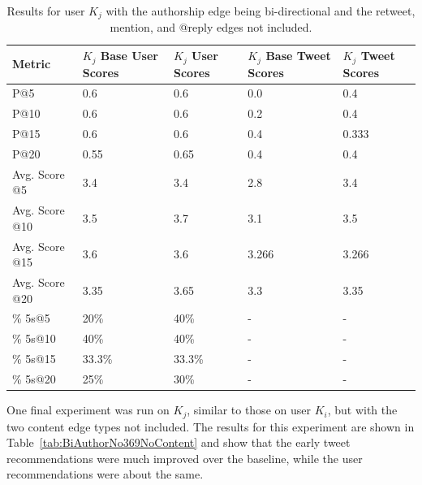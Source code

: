 \begin{table}
\centering
\begin{tabular}{l|p{2.2cm}|p{2.2cm}|p{2.2cm}|p{2.2cm}}
{\bf Metric} & {\bf $K_{j}$ Base User Scores} & {\bf $K_{j}$ User Scores} & {\bf $K_{j}$ Base Tweet Scores} & {\bf $K_{j}$ Tweet Scores} \\ \hline
P@5   & 0.6 & 0.6 & 0.0 & 0.4 \\ \hline
P@10 & 0.6 & 0.6 & 0.2 & 0.4 \\ \hline
P@15 & 0.6 & 0.6 & 0.4 & 0.333 \\ \hline
P@20 & 0.55 & 0.65 & 0.4 & 0.4 \\ \hline

Avg. Score @5   & 3.4 & 3.4 & 2.8 & 3.4 \\ \hline
Avg. Score @10 & 3.5 & 3.7 & 3.1 & 3.5 \\ \hline
Avg. Score @15 & 3.6 & 3.6 & 3.266 & 3.266 \\ \hline
Avg. Score @20 & 3.35 & 3.65 & 3.3 & 3.35 \\ \hline

\% 5s@5    & 20\% & 40\% & - & - \\ \hline
\% 5s@10  & 40\% & 40\% & - & - \\ \hline
\% 5s@15  & 33.3\% & 33.3\% & - & - \\ \hline
\% 5s@20  & 25\% & 30\% & - & - \\

\end{tabular}
\caption[Results for user $K_{j}$ using combined configuration 1]{Results for user $K_{j}$ with the authorship edge being bi-directional and the retweet, mention, and @reply edges not included.}
\label{tab:BiAuthorNo369Kj}
\end{table}

One final experiment was run on $K_{j}$, similar to those on user $K_{i}$, but with the two content edge types not included. The results for this experiment are shown in Table~\ref{tab:BiAuthorNo369NoContent} and show that the early tweet recommendations were much improved over the baseline, while the user recommendations were about the same.


